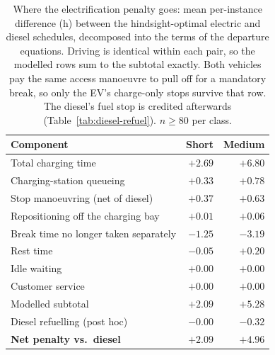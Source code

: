 \begin{table}[ht]\centering
\caption{Where the electrification penalty goes: mean per-instance difference (h) between the hindsight-optimal electric and diesel schedules, decomposed into the terms of the departure equations. Driving is identical within each pair, so the modelled rows sum to the subtotal exactly. Both vehicles pay the same access manoeuvre to pull off for a mandatory break, so only the EV's charge-only stops survive that row. The diesel's fuel stop is credited afterwards (Table~\ref{tab:diesel-refuel}). $n \geq 80$ per class.}
\label{tab:diesel-decomp}
\begin{tabular}{lrr}
\hline
Component & Short & Medium \\
\hline
Total charging time & $+2.69$ & $+6.80$ \\
Charging-station queueing & $+0.33$ & $+0.78$ \\
Stop manoeuvring (net of diesel) & $+0.37$ & $+0.63$ \\
Repositioning off the charging bay & $+0.01$ & $+0.06$ \\
Break time no longer taken separately & $-1.25$ & $-3.19$ \\
Rest time & $-0.05$ & $+0.20$ \\
Idle waiting & $+0.00$ & $+0.00$ \\
Customer service & $+0.00$ & $+0.00$ \\
\hline
Modelled subtotal & $+2.09$ & $+5.28$ \\
Diesel refuelling (post hoc) & $-0.00$ & $-0.32$ \\
\hline
\textbf{Net penalty vs.\ diesel} & $\mathbf{+2.09}$ & $\mathbf{+4.96}$ \\
\hline
\end{tabular}
\end{table}
